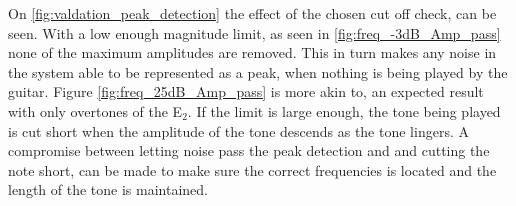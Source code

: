 On \ref{fig:valdation_peak_detection} the effect of the chosen cut off check, can be seen.
With a low enough magnitude limit, as seen in \ref{fig:freq_-3dB_Amp_pass} none of the maximum amplitudes are removed.
This in turn makes any noise in the system able to be represented as a peak, when nothing is being played by the guitar.
Figure \ref{fig:freq_25dB_Amp_pass} is more akin to, an expected result with only overtones of the E$_2$.
If the limit is large enough, the tone being played is cut short when the amplitude of the tone descends as the tone lingers.
A compromise between letting noise pass the peak detection and and cutting the note short, can be made to make sure the correct frequencies is located and the length of the tone is maintained.